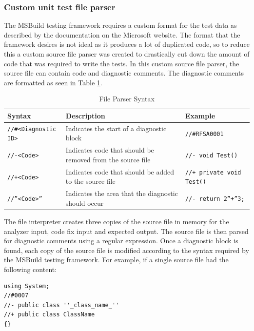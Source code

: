 \subsubsection{Custom unit test file parser}
\label{subsec:CustomUnitTestFileParser}
The MSBuild testing framework requires a custom format for the test data as described by the documentation on the Microsoft website. The format that the framework desires is not ideal as it produces a lot of duplicated code, so to reduce this a custom source file parser was created to drastically cut down the amount of code that was required to write the tests. In this custom source file parser, the source file can contain code and diagnostic comments. The diagnostic comments are formatted as seen in Table \ref{tab:FileParserSyntax}.
\begin{table}[H]
    \centering
    \caption{File Parser Syntax}
    \label{tab:FileParserSyntax}
    \begin{tabular}{|p{3.5cm}|p{8cm}|p{4cm}|}
        \hline
        Syntax&Description&Example\\
        \hline
        \texttt{//\#\textless Diagnostic ID\textgreater}&Indicates the start of a diagnostic block&\texttt{//\#RFSA0001}\\
        \texttt{//-\textless Code\textgreater}&Indicates code that should be removed from the source file&\texttt{//- void Test()}\\
        \texttt{//+\textless Code\textgreater}&Indicates code that should be added to the source file&\texttt{//+ private void Test()}\\
        \texttt{//''\textless Code\textgreater''}&Indicates the area that the diagnostic should occur&\texttt{//- return 2''+''3; }\\
        \hline
    \end{tabular}
\end{table}

The file interpreter creates three copies of the source file in memory for the analyzer input, code fix input and expected output. The source file is then parsed for diagnostic comments using a regular expression. Once a diagnostic block is found, each copy of the source file is modified according to the syntax required by the MSBuild testing framework.
For example, if a single source file had the following content:
\begin{lstlisting}[style=sharpc]
using System;
//#0007
//- public class ''_class_name_''
//+ public class ClassName
{}
\end{lstlisting}

